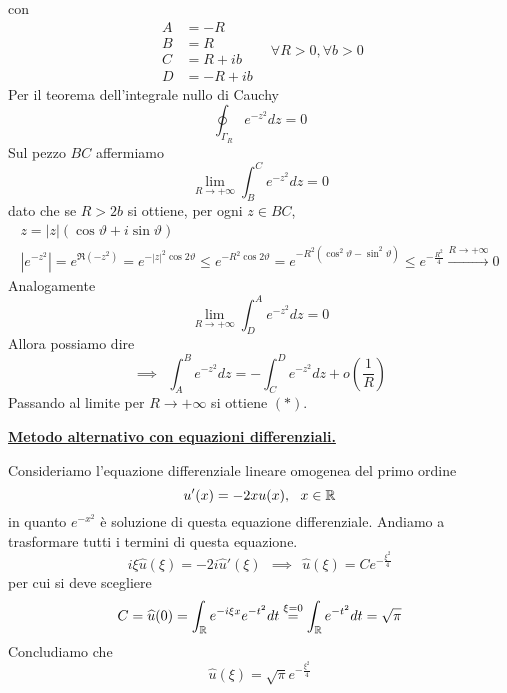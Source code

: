 con
\begin{equation*}
\begin{aligned}
A & = - R\\
B & = R\\
C & = R + ib\\
D & = - R + ib
\end{aligned} \ \ \ \ \forall R > 0,\forall b > 0
\end{equation*}
Per il teorema dell'integrale nullo di Cauchy
\begin{equation*}
\oint _{\Gamma _{R}} e^{ - z^{2}} dz = 0
\end{equation*}
Sul pezzo $BC$ affermiamo
\begin{equation*}
\lim\limits _{R\rightarrow + \infty }\int ^{C}_{B} e^{ - z^{2}} dz = 0
\end{equation*}
dato che se $R > 2b$ si ottiene, per ogni $z\in BC$,
\begin{gather*}
z = | z| (\cos \vartheta + i\sin \vartheta)\\
\left| e^{ - z^{2}}\right| = e^{\Re \left(- z^{2}\right)} = e^{ - | z| ^{2}\cos 2\vartheta } \leqslant e^{ - R^{2}\cos 2\vartheta } = e^{ - R^{2}\left(\cos^{2} \vartheta - \sin^{2} \vartheta \right)} \leqslant e^{ - \frac{R^{2}}{4}}\xrightarrow{R\rightarrow + \infty } 0
\end{gather*}
Analogamente
\begin{equation*}
\lim\limits _{R\rightarrow + \infty }\int ^{A}_{D} e^{ - z^{2}} dz = 0
\end{equation*}
Allora possiamo dire
\begin{equation*}
\implies \ \ \int ^{B}_{A} e^{ - z^{2}} dz = -\int ^{D}_{C} e^{ - z^{2}} dz + o\left(\frac{1}{R}\right)
\end{equation*}
Passando al limite per $R\rightarrow + \infty $ si ottiene $(*)$.



\underline{\textbf{Metodo alternativo con equazioni differenziali.}}

Consideriamo l'equazione differenziale lineare omogenea del primo ordine
\begin{equation*}
u'(x) = - 2xu(x) ,\ \ x\in \mathbb{R} 
\end{equation*}
in quanto $e^{ - x^{2}}$ è soluzione di questa equazione differenziale. Andiamo a trasformare tutti i termini di questa equazione.
\begin{equation*}
i\xi \hat{u}(\xi) = - 2i\hat{u} '(\xi) \ \ \implies \ \ \hat{u}(\xi) = Ce^{ - \frac{\xi ^{2}}{4}}
\end{equation*}
per cui si deve scegliere
\begin{equation*}
C = \widehat{u}(0) = \int _{\mathbb{R} } e^{ - i\xi x} e^{ - t^{2}} dt\overset{\xi = 0}{ = }\int _{\mathbb{R} } e^{ - t^{2}} dt = \sqrt{\pi }
\end{equation*}
Concludiamo che
\begin{equation*}
\boxed{\hat{u}(\xi) = \sqrt{\pi } e^{ - \frac{\xi ^{2}}{4}}}
\end{equation*}
\Soluzione

